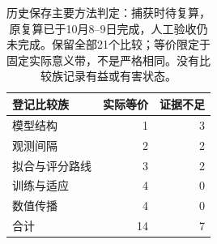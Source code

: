 \begin{table}[htbp]
\centering\small
\caption{历史保存主要方法判定：捕获时待复算，原复算已于10月8--9日完成，人工验收仍未完成。保留全部21个比较；等价限定于固定实际意义带，不是严格相同。没有比较族记录有益或有害状态。}
\label{tab:saved-analysis-states}\hypertarget{tab:saved-analysis-states}{}
\begin{tabular}{@{}lrr@{}}
\toprule
登记比较族 & 实际等价 & 证据不足\\
\midrule
模型结构 & 1 & 3\\
观测间隔 & 2 & 2\\
拟合与评分路线 & 3 & 2\\
训练与适应 & 4 & 0\\
数值传播 & 4 & 0\\
合计 & 14 & 7\\
\bottomrule
\end{tabular}
\end{table}

